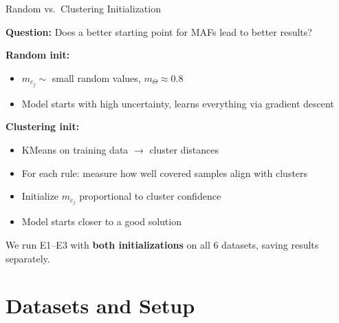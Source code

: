\documentclass[aspectratio=169,12pt]{beamer}
\begin{document}
\begin{frame}{Random vs.\ Clustering Initialization}

\textbf{Question:} Does a better starting point for MAFs lead to better results?

\vspace{1.5em}
\textbf{Random init:}
\begin{itemize}
    \item $m_{c_j} \sim$ small random values, $m_\Theta \approx 0.8$
    \item Model starts with high uncertainty, learns everything via gradient descent
\end{itemize}

\vspace{1em}
\textbf{Clustering init:}
\begin{itemize}
    \item KMeans on training data $\rightarrow$ cluster distances
    \item For each rule: measure how well covered samples align with clusters
    \item Initialize $m_{c_j}$ proportional to cluster confidence
    \item Model starts closer to a good solution
\end{itemize}

\vspace{1em}
We run E1--E3 with \textbf{both initializations} on all 6 datasets,
saving results separately.

\end{frame}


\section{Datasets and Setup}
\end{document}
